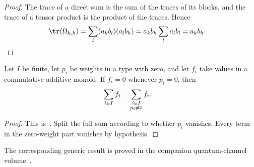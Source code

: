 \begin{proof}
    \leanok
    The trace of a direct sum is the sum of the traces of its blocks, and the
    trace of a tensor product is the product of the traces. Hence
    \begin{align}
        \tr(\Omega_{k,h})
         & =\sum_l(a_kb_l)(a_lb_h)
        =a_kb_h\sum_l a_lb_l
        =a_kb_h.
        \notag
    \end{align}
\end{proof}

\begin{lemma}
    \label{lem:finset_sum_subtype_ne_zero}
    \leanok
    Let $I$ be finite, let $p_i$ be weights in a type with zero, and let $f_i$
    take values in a commutative additive monoid. If $f_i=0$ whenever $p_i=0$,
    then
    \begin{align}
        \sum_{i\in I}f_i & =\sum_{\substack{i\in I \\p_i\ne0}}f_i.
        \notag
    \end{align}
\end{lemma}

\begin{proof}
    \leanok
    This is~\cite[``Restricting finite sums to nonzero
        weights'']{QICLean2026Blueprint}.
    Split the full sum according to whether $p_i$ vanishes. Every term in the
    zero-weight part vanishes by hypothesis.
\end{proof}


The corresponding generic result is proved in the companion quantum-channel volume~\cite[``Cyclic trace identity for rectangular powers'']{QICLean2026Blueprint}.


